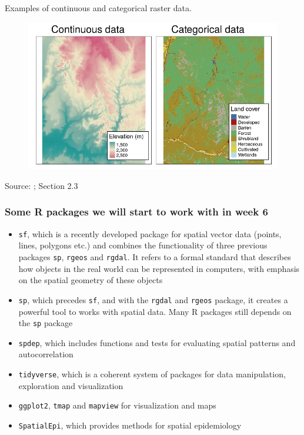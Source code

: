 \documentclass[12pt]{beamer}
\begin{document}
\begin{frame}
Examples of continuous and categorical raster data. 
\begin{figure}
\includegraphics[scale=0.60]{Figures/Raster_data.jpg}
\end{figure} 

\footnotesize Source: \citet{Lovelace2019}; Section 2.3   
\end{frame}

\begin{frame}
\frametitle{Some R packages we will start to work with in week 6}
 \begin{footnotesize}
 \begin{itemize} \setlength\itemsep{\fill}
 \item  \texttt{sf}, which is a recently developed package for spatial vector data (points, lines, polygons etc.) and combines the functionality of three previous packages \texttt{sp}, \texttt{rgeos} and \texttt{rgdal}. It refers to a formal standard that describes how objects in the real world can be represented in computers, with emphasis on the spatial geometry of these objects
 \item  \texttt{sp}, which precedes \texttt{sf}, and with the \texttt{rgdal} and \texttt{rgeos} package, it creates a powerful tool to works with spatial data. Many R packages still depends on the \texttt{sp} package
 \item \texttt{spdep}, which includes functions and tests for evaluating spatial patterns and autocorrelation
 \item  \texttt{tidyverse}, which is a coherent system of packages for data manipulation, exploration and visualization
 \item \texttt{ggplot2}, \texttt{tmap} and \texttt{mapview} for visualization and maps
 \item \texttt{SpatialEpi}, which provides methods for spatial epidemiology
 \end{itemize}
 \end{footnotesize}
\end{frame}
\end{document}
